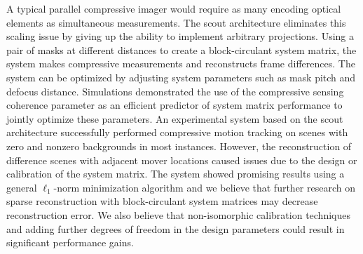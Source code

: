 A typical parallel compressive imager would require as many encoding optical elements as simultaneous measurements. The \gls{scout} architecture eliminates this scaling issue by giving up the ability to implement arbitrary projections. Using a pair of masks at different distances to create a block-circulant system matrix, the system makes compressive measurements and reconstructs frame differences. The system can be optimized by adjusting system parameters such as mask pitch and defocus distance. Simulations demonstrated the use of the compressive sensing coherence parameter as an efficient predictor of system matrix performance to jointly optimize these parameters. An experimental system based on the \gls{scout} architecture successfully performed compressive motion tracking on scenes with zero and nonzero backgrounds in most instances. However, the reconstruction of difference scenes with adjacent mover locations caused issues due to the design or calibration of the system matrix. The system showed promising results using a general $\ell_1$-norm minimization algorithm and we believe that further research on sparse reconstruction with block-circulant system matrices may decrease reconstruction error. We also believe that non-isomorphic calibration techniques and adding further degrees of freedom in the design parameters could result in significant performance gains.





